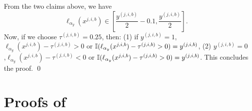         From the two claims above, we have
        \[
            \ell_{\alpha_y}(x^{j, i, b}) \in \left[\frac{y^{(j, i ,b)}}{2} - 0.1, \frac{y^{(j, i ,b)}}{2} \right].
        \]
        Now, if we choose $\tau^{(j, i, b)} = 0.25$, then: (1) if $y^{(j, i, b)} = 1$, $\ell_{\alpha_y}(x^{j, i, b})  - \tau^{(j, i, b)} > 0$ or $\mathbb{I}(\ell_{\alpha_y}(x^{j, i, b})  - \tau^{(j, i, b)} > 0) =  y^{(j, i, b)}$, (2) $y^{(j, i, b)} = 0$,$\ell_{\alpha_y}(x^{j, i, b})  - \tau^{(j, i, b)} < 0$ or $\mathbb{I}(\ell_{\alpha_y}(x^{j, i, b})  - \tau^{(j, i, b)} > 0) =  y^{(j, i, b)}$. This concludes the proof.    
\qed






\section{Proofs of }
\label{appendix:tuning-validation}
